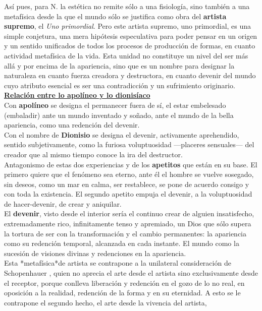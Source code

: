 \documentclass[a4paper, 10pt, twocolumn, spanish]{article}
\begin{document}
Así pues, para N. la estética no remite sólo a una fisiología, sino
también a una metafísica desde la que el mundo sólo se justifica como
obra del \textbf{artista supremo}, el \emph{Uno primordial}. Pero este artista
supremo, uno primordial, es una simple conjetura, una mera hipótesis
especulativa para poder pensar en un origen y un sentido unificados de
todos los procesos de producción de formas, en cuanto actividad
metafísica de la vida. Esta unidad no constituye un nivel del ser más
allá y por encima de la apariencia, sino que es un nombre para
designar la naturaleza en cuanto fuerza creadora y destructora, en
cuanto devenir del mundo cuyo atributo esencial es ser una
contradicción y un sufrimiento originario.\\[0pt]

\uline{\textbf{Relación entre lo apolíneo y lo dionisíaco}}\\[0pt]
Con \textbf{apolíneo} se designa el permanecer fuera de sí, el estar
embelesado (embaladir) ante un mundo inventado y soñado, ante el mundo
de la bella apariencia, como una redención del devenir.\\[0pt]
Con el nombre de \textbf{Dionisio} se designa el devenir, activamente
aprehendido, sentido subjetivamente, como la furiosa voluptuosidad
—placeres sensuales— del creador que al mismo tiempo conoce la ira del
destructor.\\[0pt]
Antagonismo de estas dos experiencias y de los \textbf{apetitos} que están en
su base. El primero quiere que el fenómeno sea eterno, ante él el
hombre se vuelve sosegado, sin deseos, como un mar en calma, ser
restablece, se pone de acuerdo consigo y con toda la existencia. El
segundo apetito empuja el devenir, a la voluptuosidad de
hacer-devenir, de crear y aniquilar.\\[0pt]
El \textbf{devenir}, visto desde el interior sería el continuo crear de
alguien insatisfecho, extremadamente rico, infinitamente tenso y
apremiado, un Dios que sólo supera la tortura de ser con la
transformación y el cambio permanentes: la apariencia como su
redención temporal, alcanzada en cada instante. El mundo como la
sucesión de visiones divinas y redenciones en la apariencia.\\[0pt]
Esta *metafísica*de artista se contrapone a la unilateral
consideración de Schopenhauer , quien no aprecia el arte desde el
artista sino exclusivamente desde el receptor, porque conlleva
liberación y redención en el gozo de lo no real, en oposición a la
realidad, redención de la forma y en su eternidad. A esto se le
contrapone el segundo hecho, el arte desde la vivencia del artista,
\end{document}
